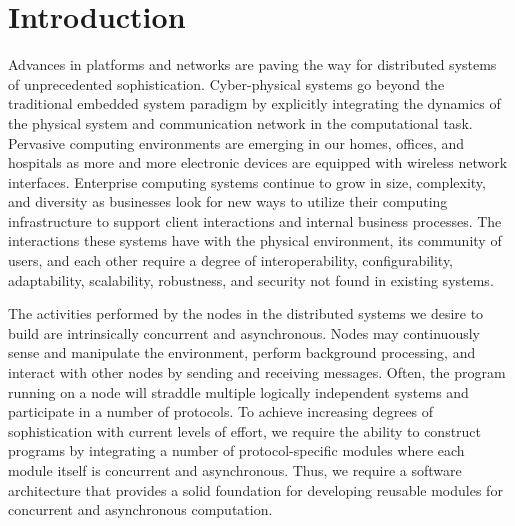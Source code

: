 \section{Introduction}

Advances in platforms and networks are paving the way for distributed systems of unprecedented sophistication.
Cyber-physical systems go beyond the traditional embedded system paradigm by explicitly integrating the dynamics of the physical system and communication network in the computational task.
Pervasive computing environments are emerging in our homes, offices, and hospitals as more and more electronic devices are equipped with wireless network interfaces.
Enterprise computing systems continue to grow in size, complexity, and diversity as businesses look for new ways to utilize their computing infrastructure to support client interactions and internal business processes.
The interactions these systems have with the physical environment, its community of users, and each other require a degree of interoperability, configurability, adaptability, scalability, robustness, and security not found in existing systems.

The activities performed by the nodes in the distributed systems we desire to build are intrinsically concurrent and asynchronous.
Nodes may continuously sense and manipulate the environment, perform background processing, and interact with other nodes by sending and receiving messages.
Often, the program running on a node will straddle multiple logically independent systems and participate in a number of protocols.
To achieve increasing degrees of sophistication with current levels of effort, we require the ability to construct programs by integrating a number of protocol-specific modules where each module itself is concurrent and asynchronous.
Thus, we require a software architecture that provides a solid foundation for developing reusable modules for concurrent and asynchronous computation.


